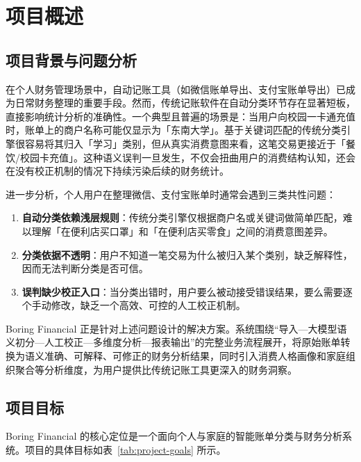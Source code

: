 \chapter{项目概述}

\section{项目背景与问题分析}

在个人财务管理场景中，自动记账工具（如微信账单导出、支付宝账单导出）已成为日常财务整理的重要手段。然而，传统记账软件在自动分类环节存在显著短板，直接影响统计分析的准确性。一个典型且普遍的场景是：当用户向校园一卡通充值时，账单上的商户名称可能仅显示为「东南大学」。基于关键词匹配的传统分类引擎很容易将其归入「学习」类别，但从真实消费意图来看，这笔交易更接近于「餐饮/校园卡充值」。这种语义误判一旦发生，不仅会扭曲用户的消费结构认知，还会在没有校正机制的情况下持续污染后续的财务统计。

进一步分析，个人用户在整理微信、支付宝账单时通常会遇到三类共性问题：

\begin{enumerate}
  \item \textbf{自动分类依赖浅层规则}：传统分类引擎仅根据商户名或关键词做简单匹配，难以理解「在便利店买口罩」和「在便利店买零食」之间的消费意图差异。
  \item \textbf{分类依据不透明}：用户不知道一笔交易为什么被归入某个类别，缺乏解释性，因而无法判断分类是否可信。
  \item \textbf{误判缺少校正入口}：当分类出错时，用户要么被动接受错误结果，要么需要逐个手动修改，缺乏一个高效、可控的人工校正机制。
\end{enumerate}

Boring Financial 正是针对上述问题设计的解决方案。系统围绕“导入—大模型语义初分—人工校正—多维度分析—报表输出”的完整业务流程展开，将原始账单转换为语义准确、可解释、可修正的财务分析结果，同时引入消费人格画像和家庭组织聚合等分析维度，为用户提供比传统记账工具更深入的财务洞察。

\section{项目目标}

Boring Financial 的核心定位是一个面向个人与家庭的智能账单分类与财务分析系统。项目的具体目标如表~\ref{tab:project-goals} 所示。


